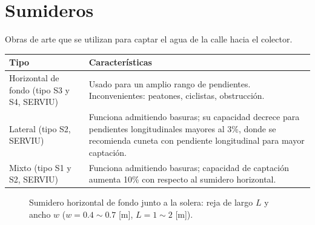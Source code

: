 \section{Sumideros}
Obras de arte que se utilizan para captar el agua de la calle hacia el colector.
\begin{table}[H]
\centering\small
\begin{tabularx}{\textwidth}{lX}
\toprule
\textbf{Tipo} & \textbf{Características}\\
\midrule
Horizontal de fondo (tipo S3 y S4, SERVIU) & Usado para un amplio rango de pendientes. Inconvenientes: peatones, ciclistas, obstrucción.\\
Lateral (tipo S2, SERVIU) & Funciona admitiendo basuras; su capacidad decrece para pendientes longitudinales mayores al 3\%, donde se recomienda cuneta con pendiente longitudinal para mayor captación.\\
Mixto (tipo S1 y S2, SERVIU) & Funciona admitiendo basuras; capacidad de captación aumenta 10\% con respecto al sumidero horizontal.\\
\bottomrule
\end{tabularx}
\end{table}

\begin{figure}[H]
\centering
{}
\caption{Sumidero horizontal de fondo junto a la solera: reja de largo $L$ y
ancho $w$ ($w=0.4\sim0.7$ [m], $L=1\sim2$ [m]).}
\end{figure}

